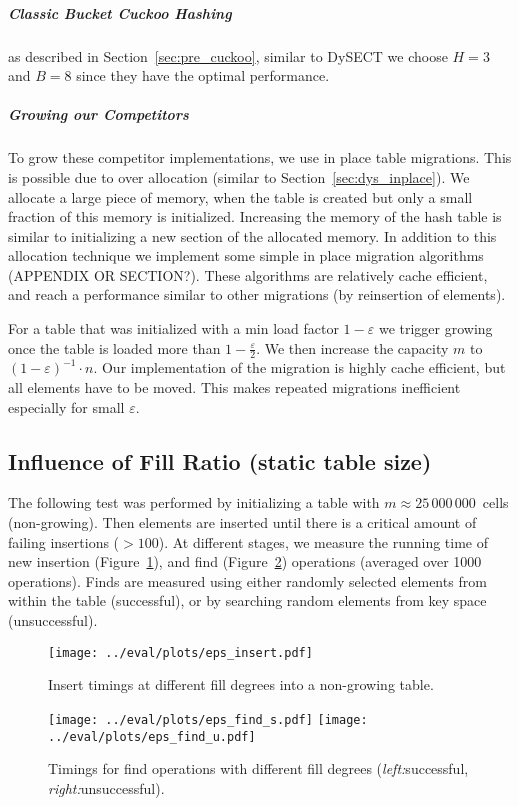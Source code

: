 \documentclass[a4paper,UKenglish]{lipics-v2016}
\begin{document}
\subparagraph*{Classic Bucket Cuckoo Hashing} as described in
Section~\ref{sec:pre_cuckoo}, similar to DySECT we choose $H=3$ and
$B=8$ since they have the optimal performance.

\subparagraph*{Growing our Competitors}
To grow these competitor implementations, we use in place table
migrations.  This is possible due to over allocation (similar to
Section~\ref{sec:dys_inplace}).  We allocate a large piece of memory,
when the table is created but only a small fraction of this memory is
initialized.  Increasing the memory of the hash table is similar to
initializing a new section of the allocated memory.  In addition to
this allocation technique we implement some simple in place migration
algorithms (APPENDIX OR SECTION?).  These algorithms are relatively
cache efficient, and reach a performance similar to other migrations
(by reinsertion of elements).

For a table that was initialized with a min load factor
$1-\varepsilon$ we trigger growing once the table is loaded more than
$1-\frac{\varepsilon}{2}$. We then increase the capacity $m$ to
$(1-\varepsilon)^{-1}\cdot n$.  Our implementation of the migration is
highly cache efficient, but all elements have to be moved.  This makes
repeated migrations inefficient especially for small $\varepsilon$.

\subsection{Influence of Fill Ratio (static table size)}
\label{sec:exp_eps}

The following test was performed by initializing a table with
$m\approx25\,000\,000$~cells (non-growing). Then elements are inserted
until there is a critical amount of failing insertions ($>100$).  At
different stages, we measure the running time of new insertion
(Figure~\ref{fig:eps_insert}), and find (Figure~\ref{fig:eps_find})
operations (averaged over 1000 operations).  Finds are measured using
either randomly selected elements from within the table (successful),
or by searching random elements from key space (unsuccessful).

\begin{figure}[ht]
  \centering
  \texttt{[image: ../eval/plots/eps\_insert.pdf]}
  \caption{\label{fig:eps_insert}Insert timings at different fill
    degrees into a non-growing table.}
\end{figure}
\begin{figure}[ht]
  \centering
  \texttt{[image: ../eval/plots/eps\_find\_s.pdf]}
  \texttt{[image: ../eval/plots/eps\_find\_u.pdf]}
  \caption{Timings for find operations with different fill degrees
    (\emph{left:}successful, \emph{right:}unsuccessful).}
  \label{fig:eps_find}
\end{figure}
\end{document}
